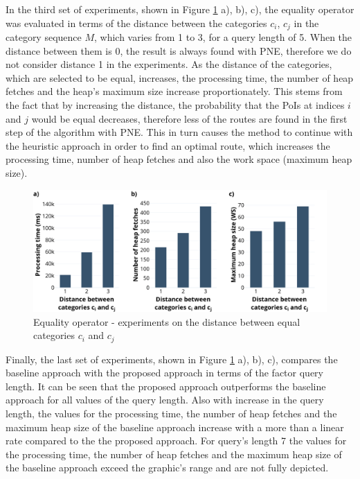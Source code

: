In the third set of experiments, shown in Figure \ref{fig:eo_distance} a), b), c), the equality operator was evaluated in terms of the  distance between the categories $c_i$, $c_j$ in the category sequence $M$, which varies from 1 to 3, for a query length of 5. When the distance between them is 0, the result is always found with PNE, therefore we do not consider distance 1 in the experiments. 
As the distance of the categories, which are selected to be equal, increases, the processing time, the number of heap fetches and the heap's maximum size increase proportionately. This stems from the fact that by increasing the distance, the probability that the PoIs at indices $i$ and $j$ would be equal decreases, therefore less of the routes are found in the first step of the algorithm with PNE. This in turn causes the method to continue with the heuristic approach in order to find an optimal route, which increases the processing time, number of heap fetches and also the work space (maximum heap size).

\begin{figure}[H]
	\includegraphics[scale=0.33]{images/eo_distance.png}
	\centering
	\caption{Equality operator - experiments on the distance between equal categories $c_i$ and $c_j$}
	\label{fig:eo_distance}
\end{figure}

Finally, the last set of experiments, shown in Figure \ref{fig:eo_distance} a), b), c), compares the baseline approach with the proposed approach in terms of the factor query length. It can be seen that the proposed approach outperforms the baseline approach for all values of the query length. Also with increase in the query length, the values for the processing time, the number of heap fetches and the maximum heap size of the baseline approach increase with a more than a linear rate compared to the the proposed approach. For query's length 7 the values for the processing time, the number of heap fetches and the maximum heap size of the baseline approach exceed the graphic's range and are not fully depicted.

